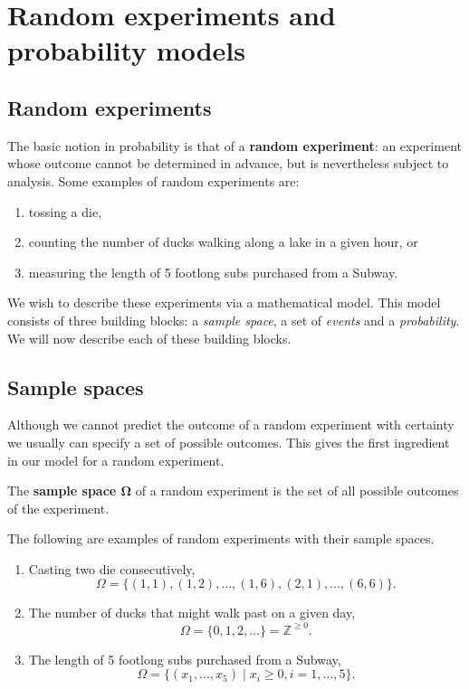 \chapter[Random experiments and probability models]{Random experiments and \\ probability models}

\section{Random experiments}

The basic notion in probability is that of a 
\textbf{random experiment}: an experiment whose outcome 
cannot be determined in advance, but is nevertheless 
subject to analysis. Some examples of random experiments are: 

\begin{enumerate}
    \item tossing a die, 
    \item counting the number of ducks walking along a lake in a given hour, or
    \item measuring the length of 5 footlong subs purchased from a Subway.
\end{enumerate}

We wish to describe these experiments via a mathematical 
model. This model consists of three building blocks: 
a \textit{sample space}, a set of \textit{events} and 
a \textit{probability}. We will now describe each of these building blocks. 

\section{Sample spaces}

Although we cannot predict the outcome of a random experiment 
with certainty we usually can specify a set of possible outcomes. 
This gives the first ingredient in our model for a random experiment. 

\begin{definition}\label{defn:sample space}
    The \textbf{sample space $\boldsymbol\Omega$} of a random experiment 
    is the set of all possible outcomes of the experiment.
\end{definition}

The following are examples of random experiments with their sample spaces. 

\begin{enumerate}
    \item Casting two die consecutively, \[\Omega = \{(1,1),(1,2), \ldots , (1,6),(2,1),\ldots ,(6,6)\}.\]
    \item The number of ducks that might walk past on a given day, \[\Omega =\{0,1,2,\ldots \} = \mathbb{Z}^{\geq 0}.\]
    \item The length of 5 footlong subs purchased from a Subway, \[\Omega = \{(x_1,\ldots ,x_5)\mid x_i\geq0, i=1,\ldots ,5\}.\]
\end{enumerate}

